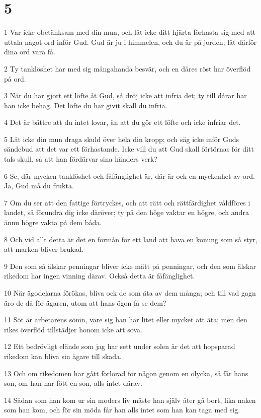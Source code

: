 \chapter{5}

\par 1 Var icke obetänksam med din mun, och låt icke ditt hjärta förhasta sig med att uttala något ord inför Gud. Gud är ju i himmelen, och du är på jorden; låt därför dina ord vara få.
\par 2 Ty tanklöshet har med sig mångahanda besvär, och en dåres röst har överflöd på ord.
\par 3 När du har gjort ett löfte åt Gud, så dröj icke att infria det; ty till dårar har han icke behag. Det löfte du har givit skall du infria.
\par 4 Det är bättre att du intet lovar, än att du gör ett löfte och icke infriar det.
\par 5 Låt icke din mun draga skuld över hela din kropp; och säg icke inför Guds sändebud att det var ett förhastande. Icke vill du att Gud skall förtörnas för ditt tals skull, så att han fördärvar sina händers verk?
\par 6 Se, där mycken tanklöshet och fåfänglighet är, där är ock en myckenhet av ord. Ja, Gud må du frukta.
\par 7 Om du ser att den fattige förtryckes, och att rätt och rättfärdighet våldföres i landet, så förundra dig icke däröver; ty på den höge vaktar en högre, och andra ännu högre vakta på dem båda.
\par 8 Och vid allt detta är det en förmån för ett land att hava en konung som så styr, att marken bliver brukad.
\par 9 Den som så älskar penningar bliver icke mätt på penningar, och den som älskar rikedom har ingen vinning därav. Också detta är fåfänglighet.
\par 10 När ägodelarna förökas, bliva ock de som äta av dem många; och till vad gagn äro de då för ägaren, utom att hans ögon få se dem?
\par 11 Söt är arbetarens sömn, vare sig han har litet eller mycket att äta; men den rikes överflöd tillstädjer honom icke att sova.
\par 12 Ett bedrövligt elände som jag har sett under solen är det att hopsparad rikedom kan bliva sin ägare till skada.
\par 13 Och om rikedomen har gått förlorad för någon genom en olycka, så får hans son, om han har fött en son, alls intet därav.
\par 14 Sådan som han kom ur sin moders liv måste han själv åter gå bort, lika naken som han kom, och för sin möda får han alls intet som han kan taga med sig.
